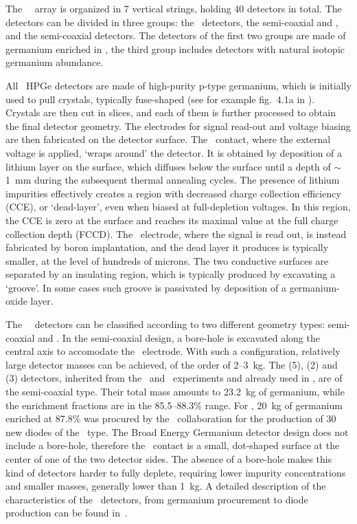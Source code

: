 The \gerda\ \phasetwo\ array is organized in 7 vertical strings, holding 40 detectors in
total. The detectors can be divided in three groups: the \bege\ detectors, the
semi-coaxial  and , and the semi-coaxial  detectors. The
detectors of the first two groups are made of germanium enriched in \gesix, the third
group includes detectors with natural isotopic germanium abundance.

All \gerda\ HPGe detectors are made of high-purity p-type germanium, which is initially
used to pull crystals, typically fuse-shaped (see for example fig.~4.1a in
\cite{Yonenaga2019}).  Crystals are then cut in slices, and each of them is further
processed to obtain the final detector geometry. The electrodes for signal read-out and
voltage biasing are then fabricated on the detector surface. The \nplus\ contact, where the
external voltage is applied, `wraps around' the detector. It is obtained by deposition of
a lithium layer on the surface, which diffuses below the surface until a depth of
$\sim$1~mm during the subsequent thermal annealing cycles. The presence of lithium
impurities effectively creates a region with decreased charge collection efficiency (CCE),
or `dead-layer', even when biased at full-depletion voltages.  In this region, the CCE is
zero at the surface and reaches its maximal value at the full charge collection depth
(FCCD). The \pplus\ electrode, where the signal is read out, is instead fabricated by boron
implantation, and the dead layer it produces is typically smaller, at the level of
hundreds of microns. The two conductive surfaces are separated by an insulating region,
which is typically produced by excavating a `groove'. In some cases such groove is
passivated by deposition of a germanium-oxide layer.

The \gerda\ \phasetwo\ detectors can be classified according to two different geometry
types: semi-coaxial and \bege. In the semi-coaxial design, a bore-hole is excavated along
the central axis to accomodate the \pplus\ electrode. With such a configuration,
relatively large detector masses can be achieved, of the order of 2--3~kg. The \ANG{} (5),
\RG{} (2) and \GTF{} (3) detectors, inherited from the \hdm\ and \igex\ experiments and
already used in \phaseone, are of the semi-coaxial type. Their total mass amounts to
23.2~kg of germanium, while the enrichment fractions are in the 85.5--88.3\% range. For
\phasetwo, 20~kg of germanium enriched at 87.8\% was procured by the \gerda\ collaboration
for the production of 30 new diodes of the \bege\ type. The Broad Energy Germanium detector
design does not include a bore-hole, therefore the \pplus\ contact is a small, dot-shaped
surface at the center of one of the two detector sides. The absence of a bore-hole makes
this kind of detectors harder to fully deplete, requiring lower impurity concentrations
and smaller masses, generally lower than 1~kg. A detailed description of the
characteristics of the \bege\ detectors, from germanium procurement to diode production can
be found in~\cite{Agostini2015e, Agostini2018a, Agostini2019}.

